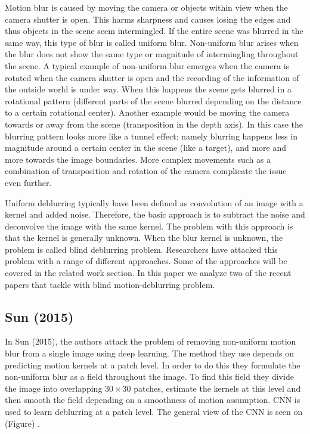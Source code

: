 \documentclass[10pt,twocolumn,letterpaper]{article}
\begin{document}
Motion blur is caused by moving the camera or objects within view when the camera shutter is open. This harms sharpness and causes losing the edges and thus objects in the scene seem intermingled. If the entire scene was blurred in the same way, this type of blur is called uniform blur. Non-uniform blur arises when the blur does not show the same type or magnitude of intermingling throughout the scene. A typical example of non-uniform blur emerges when the camera is rotated when the camera shutter is open and the recording of the information of the outside world is under way. When this happens the scene gets blurred in a rotational pattern (different parts of the scene blurred depending on the distance to a certain rotational center). Another example would be moving the camera towards or away from the scene (transposition in the depth axis). In this case the blurring pattern looks more like a tunnel effect; namely blurring happens less in magnitude around a certain center in the scene (like a target), and more and more towards the image boundaries. More complex movements such as a combination of transposition and rotation of the camera complicate the issue even further.

Uniform deblurring typically have been defined as convolution of an image with a kernel and added noise. Therefore, the basic approach is to subtract the noise and deconvolve the image with the same kernel. The problem with this approach is that the kernel is generally unknown. When the blur kernel is unknown, the problem is called blind deblurring problem. Researchers have attacked this problem with a range of different approaches. Some of the approaches will be covered in the related work section. In this paper we analyze two of the recent papers that tackle with blind motion-deblurring problem.

\subsection{Sun \textbf{\etal} (2015)}

In Sun \etal (2015), the authors attack the problem of removing non-uniform motion blur from a single image using deep learning. The method they use depends on predicting motion kernels at a patch level. In order to do this they formulate the non-uniform blur as a field throughout the image. To find this field they divide the image into overlapping $30 \times 30$ patches, estimate the kernels at this level and then smooth the field depending on a smoothness of motion assumption. CNN is used to learn deblurring at a patch level. The general view of the CNN is seen on (Figure) \cite{sun2015learning}.
\end{document}
